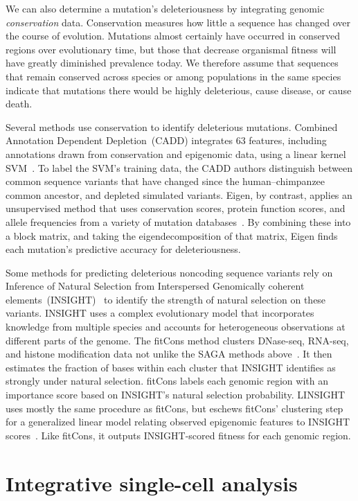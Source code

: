 \documentclass[5p]{elsarticle}
\newcommand{\rev}[1]{{\color{black}#1}}
\begin{document}
We can also determine a mutation's deleteriousness by integrating genomic \emph{conservation} data.
Conservation measures how little a sequence has changed over the course of evolution.
Mutations almost certainly have occurred in conserved regions over evolutionary time, but those that decrease organismal fitness will have greatly diminished prevalence today.
We therefore assume that sequences that remain conserved across species or among populations in the same species indicate that mutations there would be highly deleterious, cause disease\rev{, or cause} death.

Several methods use conservation to identify deleterious mutations.
Combined Annotation Dependent Depletion~(CADD) integrates 63 features, including annotations drawn from conservation and epigenomic data, using a linear kernel SVM~\cite{Kircher2014AVariants}.
To label the SVM's training data, the CADD authors distinguish between common sequence variants that have changed since the human--chimpanzee common ancestor, and depleted simulated variants.
Eigen, by contrast, applies an unsupervised method that uses conservation scores, protein function scores, and allele frequencies from a variety of mutation databases~\cite{Ionita-Laza2016AVariants}.
By combining these into a block matrix, and taking the eigendecomposition of that matrix, Eigen finds each mutation's predictive accuracy for deleteriousness.

Some methods for predicting deleterious noncoding \rev{sequen\-ce} variants rely on Inference of Natural Selection from Interspersed Genomically coherent elements~(INSIGHT)~\cite{Gronau2013InferenceDivergence} to identify the strength of natural selection on these variants.
INSIGHT uses a complex evolutionary model that incorporates knowledge from multiple species and accounts for heterogeneous observations at different parts of the genome.
The fitCons method clusters DNase-seq, RNA-seq, and histone modification data not unlike the SAGA methods above~\cite{Gulko2015AGenome}.
It then estimates the fraction of bases within each cluster that INSIGHT identifies as strongly under natural selection.
fitCons labels each genomic region with an importance score based on INSIGHT's natural selection probability.
LINSIGHT uses mostly the same procedure as fitCons, but eschews fitCons' clustering step for a generalized linear model relating observed epigenomic features to INSIGHT scores~\cite{Huang2017FastData}.
Like fitCons, it outputs INSIGHT-scored fitness for each genomic region.

\section{Integrative single-cell analysis}
\label{sec:singlecell}
\end{document}
